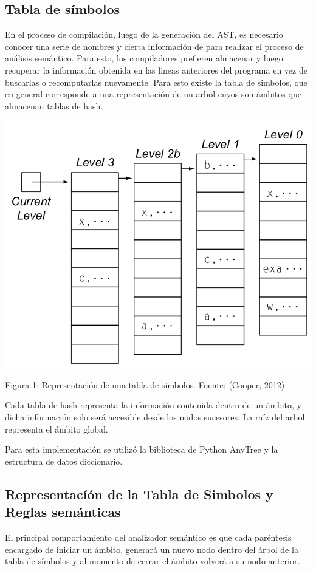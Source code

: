 \documentclass[12pt]{article}
\begin{document}
\subsection*{Tabla de s\'imbolos}
En el proceso de compilaci\'on, luego de la generaci\'on del AST, es necesario conocer una serie de nombres y cierta informaci\'on de para realizar el proceso de an\'alisis sem\'antico. Para esto, los compiladores prefieren almacenar y luego recuperar la informaci\'on obtenida en las lineas anteriores del programa en vez de buscarlas o recomputarlas nuevamente. Para esto existe la tabla de simbolos, que en general corresponde a una representaci\'on de un arbol cuyos son \'ambitos que almacenan tablas de hash.
\clearpage
\centerline{\includegraphics[trim={0 0 0 0},scale=0.35]{SYmTabex.png}}
\centerline{Figura 1: Representaci\'on de una tabla de simbolos. Fuente: (Cooper, 2012)}


Cada tabla de hash representa la informaci\'on contenida dentro de un \'ambito, y dicha informaci\'on solo ser\'a accesible desde los nodos sucesores. La ra\'iz del arbol representa el \'ambito global. 

Para esta implementaci\'on se utiliz\'o la biblioteca de Python AnyTree y la estructura de datos diccionario.


\subsection*{Representací\'on de la Tabla de Simbolos y Reglas sem\'anticas}

El principal comportamiento del analizador sem\'antico es que cada par\'entesis encargado de iniciar un \'ambito, generar\'a un nuevo nodo dentro del \'arbol de la tabla de s\'imbolos y al momento de cerrar el \'ambito volver\'a a su nodo anterior.
\end{document}
